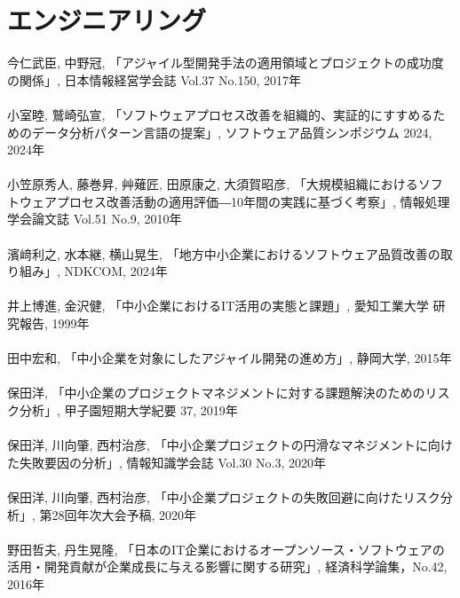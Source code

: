 \section*{エンジニアリング}
今仁武臣, 中野冠, 「アジャイル型開発手法の適用領域とプロジェクトの成功度の関係」, 日本情報経営学会誌 Vol.37 No.150, 2017年
\\\\
小室睦, 鷲崎弘宣, 「ソフトウェアプロセス改善を組織的、実証的にすすめるためのデータ分析パターン言語の提案」, ソフトウェア品質シンポジウム 2024, 2024年
\\\\
小笠原秀人, 藤巻昇, 艸薙匠, 田原康之, 大須賀昭彦, 「大規模組織におけるソフトウェアプロセス改善活動の適用評価―10年間の実践に基づく考察」, 情報処理学会論文誌 Vol.51 No.9, 2010年
\\\\
濱﨑利之, 水本継, 横山晃生, 「地方中小企業におけるソフトウェア品質改善の取り組み」, NDKCOM, 2024年
\\\\
井上博進, 金沢健, 「中小企業におけるIT活用の実態と課題」, 愛知工業大学 研究報告, 1999年
\\\\
田中宏和, 「中小企業を対象にしたアジャイル開発の進め方」, 静岡大学, 2015年
\\\\
保田洋, 「中小企業のプロジェクトマネジメントに対する課題解決のためのリスク分析」, 甲子園短期大学紀要 37, 2019年
\\\\
保田洋, 川向肇, 西村治彦, 「中小企業プロジェクトの円滑なマネジメントに向けた失敗要因の分析」, 情報知識学会誌 Vol.30 No.3, 2020年
\\\\
保田洋, 川向肇, 西村治彦, 「中小企業プロジェクトの失敗回避に向けたリスク分析」, 第28回年次大会予稿, 2020年
\\\\
野田哲夫, 丹生晃隆, 「日本のIT企業におけるオープンソース・ソフトウェアの活用・開発貢献が企業成長に与える影響に関する研究」, 経済科学論集，No.42, 2016年
